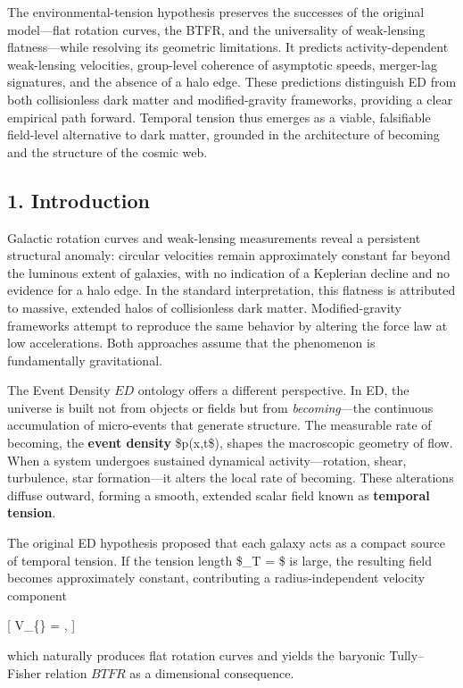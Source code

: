 The environmental-tension hypothesis preserves the successes of the
original model---flat rotation curves, the BTFR, and the universality of
weak-lensing flatness---while resolving its geometric limitations. It
predicts activity-dependent weak-lensing velocities, group-level
coherence of asymptotic speeds, merger-lag signatures, and the absence
of a halo edge. These predictions distinguish ED from both collisionless
dark matter and modified-gravity frameworks, providing a clear empirical
path forward. Temporal tension thus emerges as a viable, falsifiable
field-level alternative to dark matter, grounded in the architecture of
becoming and the structure of the cosmic web.

\subsection{1. Introduction}\label{introduction}

Galactic rotation curves and weak-lensing measurements reveal a
persistent structural anomaly: circular velocities remain approximately
constant far beyond the luminous extent of galaxies, with no indication
of a Keplerian decline and no evidence for a halo edge. In the standard
interpretation, this flatness is attributed to massive, extended halos
of collisionless dark matter. Modified-gravity frameworks attempt to
reproduce the same behavior by altering the force law at low
accelerations. Both approaches assume that the phenomenon is
fundamentally gravitational.

The Event Density \(ED\) ontology offers a different perspective. In ED,
the universe is built not from objects or fields but from
\emph{becoming}---the continuous accumulation of micro-events that
generate structure. The measurable rate of becoming, the \textbf{event
density} \$p(x,t\$), shapes the macroscopic geometry of flow. When a
system undergoes sustained dynamical activity---rotation, shear,
turbulence, star formation---it alters the local rate of becoming. These
alterations diffuse outward, forming a smooth, extended scalar field
known as \textbf{temporal tension}.

The original ED hypothesis proposed that each galaxy acts as a compact
source of temporal tension. If the tension length \$\ell\_T =
\$ is large, the resulting field becomes approximately
constant, contributing a radius-independent velocity component

{[} V\_\{\} = , {]}

which naturally produces flat rotation curves and yields the baryonic
Tully--Fisher relation \(BTFR\) as a dimensional consequence.


